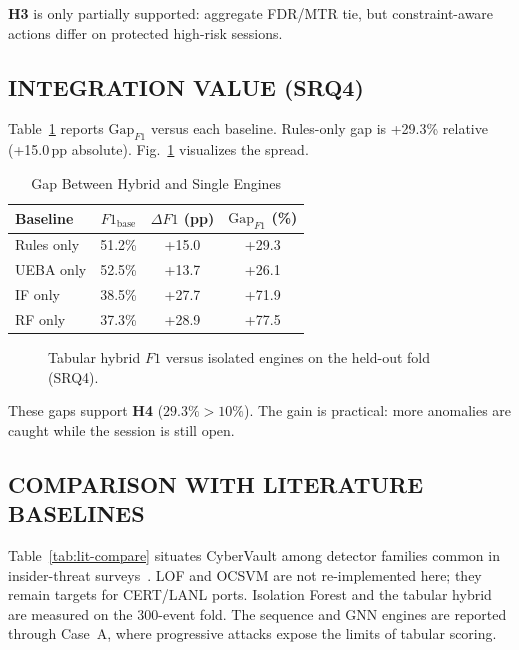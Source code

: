 \documentclass{ieeeaccess}
\begin{document}
\textbf{H3} is only partially supported: aggregate FDR/MTR tie, but constraint-aware actions differ on protected high-risk sessions.

\subsection{INTEGRATION VALUE (SRQ4)}
Table~\ref{tab:gap-matrix} reports $\mathrm{Gap}_{F1}$ versus each baseline. Rules-only gap is +29.3\% relative (+15.0\,pp absolute). Fig.~\ref{fig:integration} visualizes the spread.

\begin{table}[!t]
\caption{Gap Between Hybrid and Single Engines}
\label{tab:gap-matrix}
\centering
\scriptsize
\begin{tabular}{@{}lccc@{}}
\toprule
\textbf{Baseline} & $F1_{\mathrm{base}}$ & $\Delta F1$ (pp) & $\mathrm{Gap}_{F1}$ (\%) \\
\midrule
Rules only & 51.2\% & +15.0 & +29.3 \\
UEBA only & 52.5\% & +13.7 & +26.1 \\
IF only & 38.5\% & +27.7 & +71.9 \\
RF only & 37.3\% & +28.9 & +77.5 \\
\bottomrule
\end{tabular}
\end{table}

\begin{figure}[!t]
\centering
{}
\caption{Tabular hybrid $F1$ versus isolated engines on the held-out fold (SRQ4).}
\label{fig:integration}
\end{figure}

These gaps support \textbf{H4} ($29.3\% > 10\%$). The gain is practical: more anomalies are caught while the session is still open.

\subsection{COMPARISON WITH LITERATURE BASELINES}
Table~\ref{tab:lit-compare} situates CyberVault among detector families common in insider-threat surveys~\cite{ref6,ref24}. LOF and OCSVM are not re-implemented here; they remain targets for CERT/LANL ports. Isolation Forest and the tabular hybrid are measured on the 300-event fold. The sequence and GNN engines are reported through Case~A, where progressive attacks expose the limits of tabular scoring.
\end{document}
